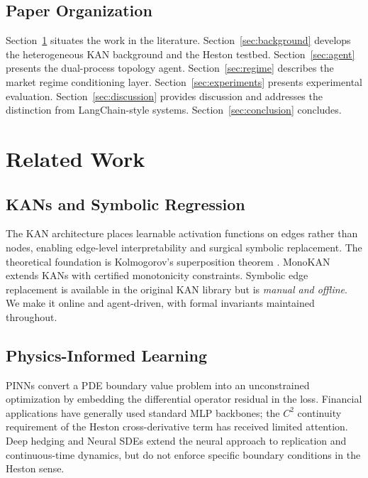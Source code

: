 \documentclass[11pt,a4paper]{article}
\begin{document}
\subsection{Paper Organization}

Section~\ref{sec:related} situates the work in the literature.
Section~\ref{sec:background} develops the heterogeneous KAN background and the Heston
testbed. Section~\ref{sec:agent} presents the dual-process topology agent.
Section~\ref{sec:regime} describes the market regime conditioning layer.
Section~\ref{sec:experiments} presents experimental evaluation.
Section~\ref{sec:discussion} provides discussion and addresses the distinction from
LangChain-style systems. Section~\ref{sec:conclusion} concludes.

\section{Related Work}
\label{sec:related}

\subsection{KANs and Symbolic Regression}

The KAN architecture \citep{liu_etal_2024_kan} places learnable activation functions
on edges rather than nodes, enabling edge-level interpretability and surgical symbolic
replacement. The theoretical foundation is Kolmogorov's superposition theorem
\citep{kolmogorov1957representation}. MonoKAN \citep{polo_molina_etal_2024_monokan}
extends KANs with certified monotonicity constraints. Symbolic edge replacement is
available in the original KAN library but is \emph{manual and offline}. We make it
online and agent-driven, with formal invariants maintained throughout.

\subsection{Physics-Informed Learning}

PINNs \citep{raissi2019physics} convert a PDE boundary value problem into an
unconstrained optimization by embedding the differential operator residual in the
loss. Financial applications \citep{horvath2021deep} have generally used standard MLP
backbones; the $C^2$ continuity requirement of the Heston cross-derivative term has
received limited attention. Deep hedging \citep{buhler2019deep} and Neural SDEs
\citep{kidger2021neural} extend the neural approach to replication and continuous-time
dynamics, but do not enforce specific boundary conditions in the Heston sense.
\end{document}
